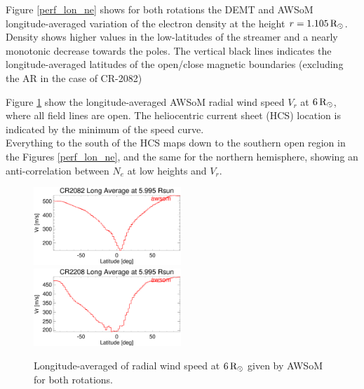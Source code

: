 \documentclass[namedreferences]{solarphysics}
\newcommand{\mrsun}{{\rm R_\odot}}
\begin{document}
\begin{article}



Figure \ref{perf_lon_ne} shows for both rotations the DEMT and AWSoM longitude-averaged variation of the electron density at the height $r=1.105\,\mrsun$. Density shows higher values in the low-latitudes of the streamer and a nearly monotonic decrease towards the poles. The vertical black lines indicates the longitude-averaged latitudes of the open/close magnetic boundaries (excluding the AR in the case of CR-2082)



Figure \ref{perf_lon_vr} show the longitude-averaged AWSoM radial wind speed $V_r$ at $6\,\mrsun$, where all field lines are open. The heliocentric current sheet (HCS) location is indicated by the minimum of the speed curve.\\

Everything to the south of the HCS maps down to the southern open region in the Figures \ref{perf_lon_ne}, and the same for the northern hemisphere, showing an anti-correlation between $N_e$ at low heights and $V_r$.


\begin{figure}[h!]
\begin{center}
\includegraphics[width=0.495\textwidth]{figs/Perfil_Vr_2082_5995.eps}
\includegraphics[width=0.495\textwidth]{figs/Perfil_Vr_2208_5995.eps}
\caption{Longitude-averaged of radial wind speed at $6\,\mrsun$ given by AWSoM for both rotations.}
\label{perf_lon_vr}
\end{center}
\end{figure}




\end{article}
\end{document}
